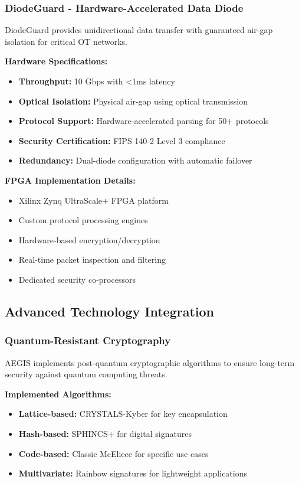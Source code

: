 \documentclass[12pt,a4paper]{article}
\begin{document}
\subsubsection{DiodeGuard - Hardware-Accelerated Data Diode}

DiodeGuard provides unidirectional data transfer with guaranteed air-gap isolation for critical OT networks.

\textbf{Hardware Specifications:}
\begin{itemize}
    \item \textbf{Throughput:} 10 Gbps with <1ms latency
    \item \textbf{Optical Isolation:} Physical air-gap using optical transmission
    \item \textbf{Protocol Support:} Hardware-accelerated parsing for 50+ protocols
    \item \textbf{Security Certification:} FIPS 140-2 Level 3 compliance
    \item \textbf{Redundancy:} Dual-diode configuration with automatic failover
\end{itemize}

\textbf{FPGA Implementation Details:}
\begin{itemize}
    \item Xilinx Zynq UltraScale+ FPGA platform
    \item Custom protocol processing engines
    \item Hardware-based encryption/decryption
    \item Real-time packet inspection and filtering
    \item Dedicated security co-processors
\end{itemize}

\subsection{Advanced Technology Integration}

\subsubsection{Quantum-Resistant Cryptography}

AEGIS implements post-quantum cryptographic algorithms to ensure long-term security against quantum computing threats.

\textbf{Implemented Algorithms:}
\begin{itemize}
    \item \textbf{Lattice-based:} CRYSTALS-Kyber for key encapsulation
    \item \textbf{Hash-based:} SPHINCS+ for digital signatures
    \item \textbf{Code-based:} Classic McEliece for specific use cases
    \item \textbf{Multivariate:} Rainbow signatures for lightweight applications
\end{itemize}
\end{document}
